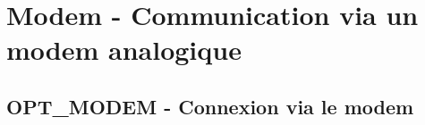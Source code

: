\section{Modem - Communication via un modem analogique}

\subsection {OPT\_MODEM - Connexion via le modem}


